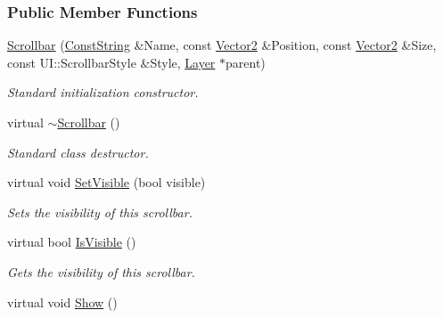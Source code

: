 \subsubsection*{Public Member Functions}
\begin{DoxyCompactItemize}
\item 
\hyperlink{classphys_1_1UI_1_1Scrollbar_a881584c25e2d1a29daeb324d4b8a017d}{Scrollbar} (\hyperlink{namespacephys_a5ce5049f8b4bf88d6413c47b504ebb31}{ConstString} \&Name, const \hyperlink{classphys_1_1Vector2}{Vector2} \&Position, const \hyperlink{classphys_1_1Vector2}{Vector2} \&Size, const UI::ScrollbarStyle \&Style, \hyperlink{classphys_1_1UI_1_1Layer}{Layer} $\ast$parent)
\begin{DoxyCompactList}\small\item\em Standard initialization constructor. \item\end{DoxyCompactList}\item 
\hypertarget{classphys_1_1UI_1_1Scrollbar_af9fb189c7856353a930c0a228fc0cf42}{
virtual \hyperlink{classphys_1_1UI_1_1Scrollbar_af9fb189c7856353a930c0a228fc0cf42}{$\sim$Scrollbar} ()}
\label{classphys_1_1UI_1_1Scrollbar_af9fb189c7856353a930c0a228fc0cf42}

\begin{DoxyCompactList}\small\item\em Standard class destructor. \item\end{DoxyCompactList}\item 
virtual void \hyperlink{classphys_1_1UI_1_1Scrollbar_a2d8997e0bbbb1c17af5128fea98fb1e4}{SetVisible} (bool visible)
\begin{DoxyCompactList}\small\item\em Sets the visibility of this scrollbar. \item\end{DoxyCompactList}\item 
virtual bool \hyperlink{classphys_1_1UI_1_1Scrollbar_a213c946ccadd3b689f59e2761a1d1848}{IsVisible} ()
\begin{DoxyCompactList}\small\item\em Gets the visibility of this scrollbar. \item\end{DoxyCompactList}\item 
\hypertarget{classphys_1_1UI_1_1Scrollbar_a42955ae0e2b273ca9ea392a8dbc62604}{
virtual void \hyperlink{classphys_1_1UI_1_1Scrollbar_a42955ae0e2b273ca9ea392a8dbc62604}{Show} ()}
\label{classphys_1_1UI_1_1Scrollbar_a42955ae0e2b273ca9ea392a8dbc62604}


\end{DoxyCompactItemize}
